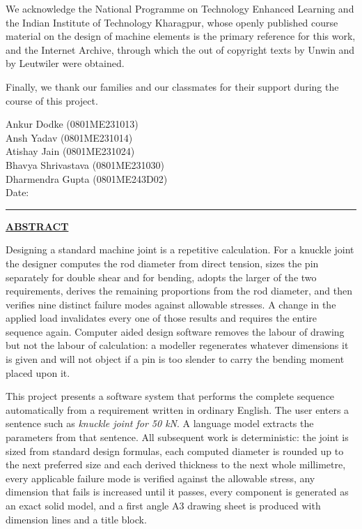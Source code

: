 \documentclass[12pt,a4paper]{report}
\newcommand{\fmhead}[1]{\begin{center}{\fontsize{16}{20}\selectfont\bfseries\underline{#1}}\end{center}\vspace{2mm}}
\newcommand{\toctoc}[1]{\clearpage\phantomsection\addcontentsline{toc}{chapter}{#1}}
\begin{document}
\hspace{10mm}We acknowledge the National Programme on Technology Enhanced Learning and the Indian
Institute of Technology Kharagpur, whose openly published course material on the design of machine
elements is the primary reference for this work, and the Internet Archive, through which the out of
copyright texts by Unwin and by Leutwiler were obtained.

\hspace{10mm}Finally, we thank our families and our classmates for their support during the course of
this project.

\vspace{10mm}\begin{flushright}\singlespacing
Ankur Dodke (0801ME231013)\\Ansh Yadav (0801ME231014)\\Atishay Jain (0801ME231024)\\
Bhavya Shrivastava (0801ME231030)\\Dharmendra Gupta (0801ME243D02)\\[3mm]
Date:\ \rule{30mm}{0.4pt}\end{flushright}\onehalfspacing

\toctoc{Abstract}
\fmhead{ABSTRACT}
\noindent Designing a standard machine joint is a repetitive calculation. For a knuckle joint the
designer computes the rod diameter from direct tension, sizes the pin separately for double shear
and for bending, adopts the larger of the two requirements, derives the remaining proportions from
the rod diameter, and then verifies nine distinct failure modes against allowable stresses. A change
in the applied load invalidates every one of those results and requires the entire sequence again.
Computer aided design software removes the labour of drawing but not the labour of calculation: a
modeller regenerates whatever dimensions it is given and will not object if a pin is too slender to
carry the bending moment placed upon it.

\hspace{10mm}This project presents a software system that performs the complete sequence
automatically from a requirement written in ordinary English. The user enters a sentence such as
\textit{knuckle joint for 50 kN}. A language model extracts the parameters from that sentence. All
subsequent work is deterministic: the joint is sized from standard design formulas, each computed
diameter is rounded up to the next preferred size and each derived thickness to the next whole
millimetre, every applicable failure mode is verified against the allowable stress, any dimension
that fails is increased until it passes, every component is generated as an exact solid model, and a
first angle A3 drawing sheet is produced with dimension lines and a title block.
\end{document}
